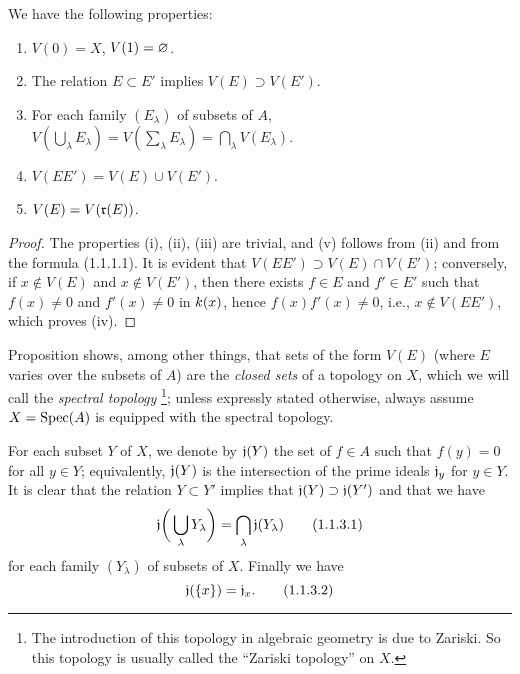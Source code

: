 \begin{prop}[1.1.2]
\label{1.1.1.2}
We have the following properties:
\begin{enumerate}[label=\emph{(\roman*)}]
  \item $V(0)=X$, $V(1)=\varnothing$.
  \item The relation $E\subset E'$ implies $V(E)\supset V(E')$.
  \item For each family $(E_\lambda)$ of subsets of $A$, $V(\bigcup_\lambda E_\lambda)=V(\sum_\lambda E_\lambda)=\bigcap_\lambda V(E_\lambda)$.
  \item $V(EE')=V(E)\cup V(E')$.
  \item $V(E)=V(\mathfrak{r}(E))$.
\end{enumerate}
\end{prop}

\begin{proof}
\label{proof-1.1.1.2}
The properties (i), (ii), (iii) are trivial, and (v) follows from (ii) and from the formula (1.1.1.1).
It is evident that $V(EE')\supset V(E)\cap V(E')$; conversely, if $x\not\in V(E)$ and $x\not\in V(E')$, then there exists $f\in E$ and $f'\in E'$ such that $f(x)\neq 0$ and $f'(x)\neq 0$ in $k(x)$, hence $f(x)f'(x)\neq 0$, i.e., $x\not\in V(EE')$, which proves (iv).
\end{proof}

Proposition  shows, among other things, that sets of the form $V(E)$ (where $E$ varies over the subsets of $A$) are the \emph{closed sets} of a topology on $X$, which we will call the \emph{spectral topology}
\footnote{The introduction of this topology in algebraic geometry is due to Zariski.
So this topology is usually called the ``Zariski topology'' on $X$.};
unless expressly stated otherwise, always assume $X={\mathop{\mathrm{Spec}}\nolimits}(A)$ is equipped with the spectral topology.

\begin{env}[1.1.3]
\label{1.1.1.3}
For each subset $Y$ of $X$, we denote by $\mathfrak{j}(Y)$ the set of $f\in A$ such that
$f(y)=0$ for all $y\in Y$; equivalently, $\mathfrak{j}(Y)$ is the intersection of the prime
ideals $\mathfrak{j}_y$ for $y\in Y$. It is clear that the relation $Y\subset Y'$ implies
that $\mathfrak{j}(Y)\supset\mathfrak{j}(Y')$ and that we have
\[
  \mathfrak{j}\bigg(\bigcup_\lambda Y_\lambda\bigg)=\bigcap_\lambda\mathfrak{j}(Y_\lambda)
  \tag{1.1.3.1}
\]
for each family $(Y_\lambda)$ of subsets of $X$. Finally we have
\[
  \mathfrak{j}(\{x\})=\mathfrak{j}_x.
  \tag{1.1.3.2}
\]
\end{env}

